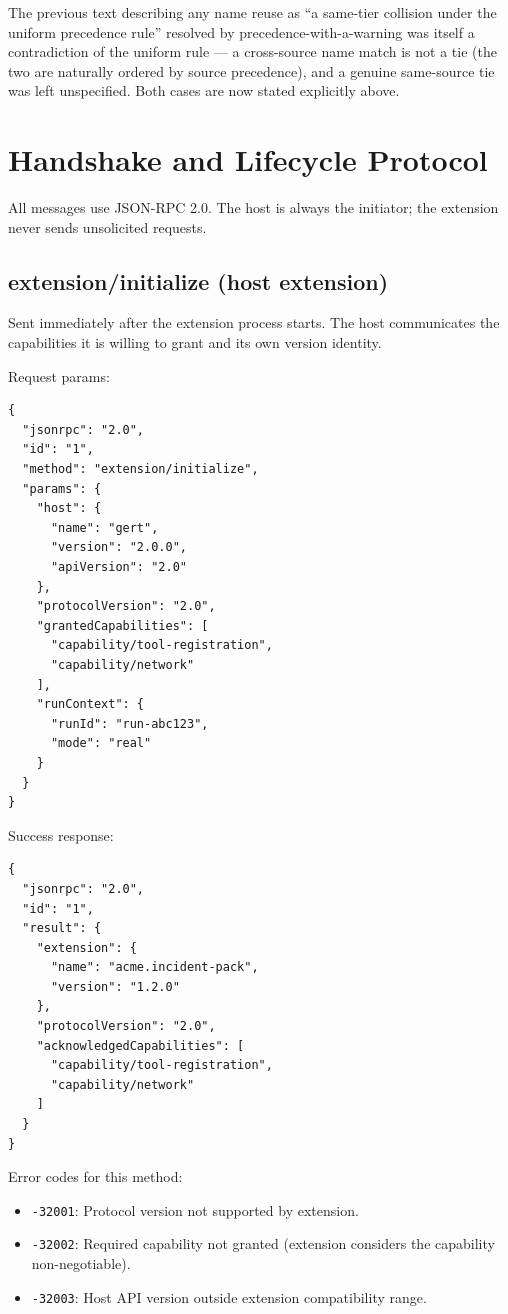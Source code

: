 The previous text describing any name reuse as ``a same-tier collision
under the uniform precedence rule'' resolved by precedence-with-a-warning
was itself a contradiction of the uniform rule --- a cross-source name
match is not a tie (the two are naturally ordered by source precedence),
and a genuine same-source tie was left unspecified. Both cases are now
stated explicitly above.

\section{Handshake and Lifecycle Protocol}
\label{sec:ext-handshake}

All messages use JSON-RPC 2.0.  The host is always the initiator; the
extension never sends unsolicited requests.

\subsection{extension/initialize (host \textrightarrow{} extension)}

Sent immediately after the extension process starts.  The host communicates
the capabilities it is willing to grant and its own version identity.

Request params:

\begin{verbatim}
{
  "jsonrpc": "2.0",
  "id": "1",
  "method": "extension/initialize",
  "params": {
    "host": {
      "name": "gert",
      "version": "2.0.0",
      "apiVersion": "2.0"
    },
    "protocolVersion": "2.0",
    "grantedCapabilities": [
      "capability/tool-registration",
      "capability/network"
    ],
    "runContext": {
      "runId": "run-abc123",
      "mode": "real"
    }
  }
}
\end{verbatim}

Success response:

\begin{verbatim}
{
  "jsonrpc": "2.0",
  "id": "1",
  "result": {
    "extension": {
      "name": "acme.incident-pack",
      "version": "1.2.0"
    },
    "protocolVersion": "2.0",
    "acknowledgedCapabilities": [
      "capability/tool-registration",
      "capability/network"
    ]
  }
}
\end{verbatim}

Error codes for this method:

\begin{itemize}
  \item \texttt{-32001}: Protocol version not supported by extension.
  \item \texttt{-32002}: Required capability not granted (extension considers
        the capability non-negotiable).
  \item \texttt{-32003}: Host API version outside extension compatibility range.
\end{itemize}

